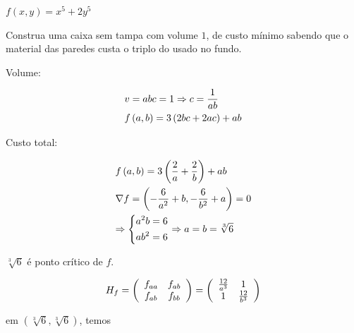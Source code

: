 \documentclass{book}
\begin{document}
\begin{ex}
$f\left( {x,y} \right) = x^5  + 2y^5$
\end{ex}

\begin{ex}
    Construa uma caixa sem tampa com volume $1$, de custo m\'inimo sabendo que o material das paredes custa o triplo do usado no fundo.
\end{ex}

\begin{sol}

Volume:

\[
\begin{gathered}
v = abc = 1 \Rightarrow c = \frac{1}
{{ab}} \hfill \\
f\left( {a,b} \right) = 3\left( {2bc + 2ac} \right) + ab \hfill \\
\end{gathered}
\]

Custo total:

\[
\begin{gathered}
f\left( {a,b} \right) = 3\left( {\frac{2}
a + \frac{2}
{b}} \right) + ab \hfill \\
\nabla f = \left( { - \frac{6}
{{a^2 }} + b, - \frac{6}
{{b^2 }} + a} \right) = 0 \hfill \\
\Rightarrow \left\{ \begin{gathered}
a^2 b = 6 \hfill \\
ab^2  = 6 \hfill \\
\end{gathered}  \right. \Rightarrow a = b = \sqrt[3]{6} \hfill \\
\end{gathered}
\]

$\sqrt[3]{6}$ \'e ponto cr\'itico de $f$.

\[
H_f  = \left( {\begin{array}{*{20}c}
{f_{aa} } & {f_{ab} }  \\
{f_{ab} } & {f_{bb} }  \\

\end{array} } \right) = \left( {\begin{array}{*{20}c}
{\tfrac{{12}}
{{a^3 }}} & 1  \\
1 & {\tfrac{{12}}
{{b^3 }}}  \\

\end{array} } \right)
\]

em $\left( {\sqrt[3]{6},\sqrt[3]{6}} \right)$, temos


\end{sol}
\end{document}
